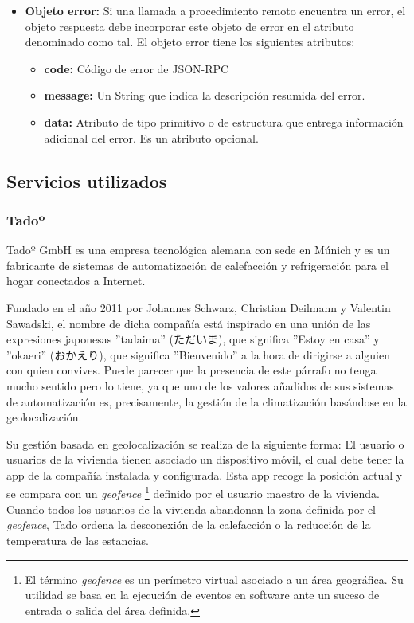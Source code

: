 \documentclass[spanish,12pt, a4paper, twoside]{paper}
\begin{document}
\begin{itemize}
\item \textbf{Objeto error:} Si una llamada a procedimiento remoto encuentra un error, el objeto respuesta debe incorporar este objeto de error en el atributo denominado como tal. El objeto error tiene los siguientes atributos:

\begin{itemize}
\item \textbf{code:} Código de error de JSON-RPC

\item \textbf{message:} Un String que indica la descripción resumida del error.

\item \textbf{data:} Atributo de tipo primitivo o de estructura que entrega información adicional del error. Es un atributo opcional.
\end{itemize}

\end{itemize}

\subsection{Servicios utilizados}

\subsubsection{Tadoº}

Tadoº GmbH es una empresa tecnológica alemana con sede en Múnich y es un fabricante de sistemas de automatización de calefacción y refrigeración para el hogar conectados a Internet.
\newline

Fundado en el año 2011 por Johannes Schwarz, Christian Deilmann y Valentin Sawadski, el nombre de dicha compañía está inspirado en una unión de las expresiones japonesas ''tadaima'' (ただいま), que significa ''Estoy en casa'' y ''okaeri'' (おかえり), que significa ''Bienvenido'' a la hora de dirigirse a alguien con quien convives. Puede parecer que la presencia de este párrafo no tenga mucho sentido pero lo tiene, ya que uno de los valores añadidos de sus sistemas de automatización es, precisamente, la gestión de la climatización basándose en la geolocalización.
\newline

Su gestión basada en geolocalización se realiza de la siguiente forma: El usuario o usuarios de la vivienda tienen asociado un dispositivo móvil, el cual debe tener la app de la compañía instalada y configurada. Esta app recoge la posición actual y se compara con un \emph{geofence} \footnote{El término \emph{geofence} es un perímetro virtual asociado a un área geográfica. Su utilidad se basa en la ejecución de eventos en software ante un suceso de entrada o salida del área definida. } definido por el usuario maestro de la vivienda. Cuando todos los usuarios de la vivienda abandonan la zona definida por el \emph{geofence}, Tado ordena la desconexión de la calefacción o la reducción de la temperatura de las estancias.
\newline
\end{document}
